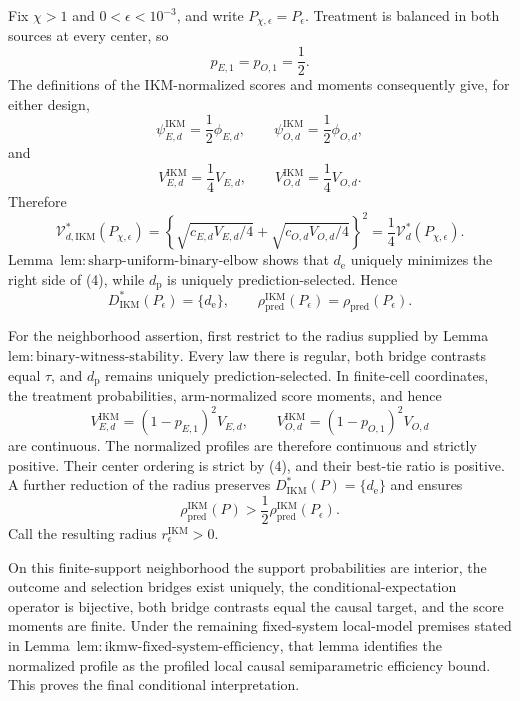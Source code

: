 Fix \(\chi>1\) and \(0<\epsilon<10^{-3}\), and write \(P_{\chi,\epsilon}=P_\epsilon\). Treatment is balanced in both sources at every center, so
\[
 p_{E,1}=p_{O,1}=\frac12.                              \tag{1}
\]
The definitions of the IKM-normalized scores and moments consequently give, for either design,
\[
 \psi_{E,d}^{\mathrm{IKM}}=\frac12\phi_{E,d},
 \qquad
 \psi_{O,d}^{\mathrm{IKM}}=\frac12\phi_{O,d},          \tag{2}
\]
and
\[
 V_{E,d}^{\mathrm{IKM}}=\frac14V_{E,d},
 \qquad
 V_{O,d}^{\mathrm{IKM}}=\frac14V_{O,d}.                \tag{3}
\]
Therefore
\[
 \mathcal V_{d,\mathrm{IKM}}^*(P_{\chi,\epsilon})
 =\left\{\sqrt{c_{E,d}V_{E,d}/4}
 +\sqrt{c_{O,d}V_{O,d}/4}\right\}^2
 =\frac14\mathcal V_d^*(P_{\chi,\epsilon}).           \tag{4}
\]
Lemma~\(\mathrm{lem{:}sharp\text{-}uniform\text{-}binary\text{-}elbow}\) shows that \(d_{\mathrm e}\) uniquely minimizes the right side of (4), while \(d_{\mathrm p}\) is uniquely prediction-selected. Hence
\[
 D_{\mathrm{IKM}}^*(P_\epsilon)=\{d_{\mathrm e}\},
 \qquad
 \rho_{\mathrm{pred}}^{\mathrm{IKM}}(P_\epsilon)
 =\rho_{\mathrm{pred}}(P_\epsilon).                   \tag{5}
\]

For the neighborhood assertion, first restrict to the radius supplied by Lemma~\(\mathrm{lem{:}binary\text{-}witness\text{-}stability}\). Every law there is regular, both bridge contrasts equal \(\tau\), and \(d_{\mathrm p}\) remains uniquely prediction-selected. In finite-cell coordinates, the treatment probabilities, arm-normalized score moments, and hence
\[
 V_{E,d}^{\mathrm{IKM}}=(1-p_{E,1})^2V_{E,d},
 \qquad
 V_{O,d}^{\mathrm{IKM}}=(1-p_{O,1})^2V_{O,d}           \tag{6}
\]
are continuous. The normalized profiles are therefore continuous and strictly positive. Their center ordering is strict by (4), and their best-tie ratio is positive. A further reduction of the radius preserves \(D_{\mathrm{IKM}}^*(P)=\{d_{\mathrm e}\}\) and ensures
\[
 \rho_{\mathrm{pred}}^{\mathrm{IKM}}(P)
 >\frac12\rho_{\mathrm{pred}}^{\mathrm{IKM}}(P_\epsilon).
\]
Call the resulting radius \(r_\epsilon^{\mathrm{IKM}}>0\).

On this finite-support neighborhood the support probabilities are interior, the outcome and selection bridges exist uniquely, the conditional-expectation operator is bijective, both bridge contrasts equal the causal target, and the score moments are finite. Under the remaining fixed-system local-model premises stated in Lemma~\(\mathrm{lem{:}ikmw\text{-}fixed\text{-}system\text{-}efficiency}\), that lemma identifies the normalized profile as the profiled local causal semiparametric efficiency bound. This proves the final conditional interpretation.